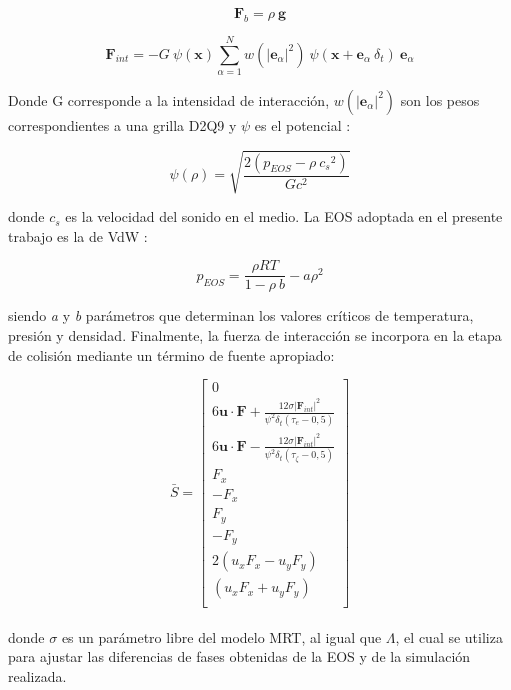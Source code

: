 \begin{equation}
	{\mathbf{F}}_{b} = \rho \> \mathbf{g}
	\label{eq:Fb}
\end{equation}


\begin{equation}
{\mathbf{F}}_{int} = - G \> \psi(\mathbf{x}) \sum_{\alpha=1}^{N} w({|{\mathbf{e}}_{\alpha}|}^{2}) \> \psi (\mathbf{x} + {\mathbf{e}}_{\alpha} \> \delta_{t}) \> {\mathbf{e}}_{\alpha} 
\label{eq:fint}
\end{equation}

Donde G corresponde a la intensidad de interacción, $w({|{\mathbf{e}}_{\alpha}|}^{2})$ son los pesos correspondientes a una grilla D2Q9 y $\psi$ es el potencial :

\begin{equation} 
    \psi(\rho) = \sqrt{\frac{2 (p_{EOS} - \rho \> {c_{s}}^{2})}{G {c}^{2}}}
    \label{eq:psi}
\end{equation}

donde $c_{s}$ es la velocidad del sonido en el medio. La EOS adoptada en el presente trabajo es la de VdW :

\begin{equation}
    p_{EOS} = \frac{\rho R T}{1- \rho \> b} - a {\rho}^{2}
    \label{eq:rho_eos}
\end{equation}

siendo \textit{a} y \textit{b} parámetros que determinan los valores críticos de temperatura, presión y densidad. Finalmente, la fuerza de interacción se incorpora en la etapa de colisión mediante un término de fuente apropiado:


\begin{equation}
    \bar{S} = 
    \left[ \begin{array}{c} 
        0\\
        6 \mathbf{u}\cdot \mathbf{F} + \frac{12 \sigma {|{\mathbf{F}_{int}|}}^{2} }{{\psi}^{2} \delta_{t} (\tau_{e} - 0,5)}\\
        6 \mathbf{u}\cdot \mathbf{F} - \frac{12 \sigma {|{\mathbf{F}_{int}|}}^{2} }{{\psi}^{2} \delta_{t} (\tau_{\zeta } - 0,5)}\\
        F_{x}\\
        -F_{x}\\
        F_{y}\\
        -F_{y}\\
        2(u_{x} F_{x} - u_{y} F_{y} )\\
        (u_{x} F_{x} + u_{y} F_{y} )\\              
    \end{array}
    \right]    
    \label{eq:termino_fuente_s}
\end{equation}
\\
donde $\sigma$ es un parámetro libre del modelo MRT, al igual que $\Lambda$, el cual se utiliza para ajustar las diferencias de fases obtenidas de la EOS y de la simulación realizada.

